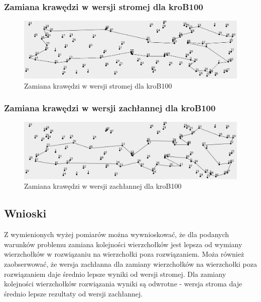 \documentclass[a4paper]{article}
\begin{document}
\subsubsection{Zamiana krawędzi w wersji stromej dla kroB100}

\begin{figure}[H]
\centering
\includegraphics[width=\textwidth]{lab2/kroB_steepest_corners}
\caption{Zamiana krawędzi w wersji stromej dla kroB100}
\end{figure}

\subsubsection{Zamiana krawędzi w wersji zachłannej dla kroB100}

\begin{figure}[H]
\centering
\includegraphics[width=\textwidth]{lab2/kroB_greedy_corners}
\caption{Zamiana krawędzi w wersji zachłannej dla kroB100}
\end{figure}

\subsection{Wnioski}

Z wymienionych wyżej pomiarów można wywnioskować, że dla podanych warunków problemu zamiana kolejności wierzchołków jest lepsza od wymiany wierzchołków w rozwiązaniu na wierzchołki poza rozwiązaniem. Moża również zaobserwować, że wersja zachłanna dla zamiany wierzchołków na wierzchołki poza rozwiązaniem daje średnio lepsze wyniki od wersji stromej. Dla zamiany kolejności wierzchołków rozwiązania wyniki są odwrotne - wersja stroma daje średnio lepsze rezultaty od wersji zachłannej.
\end{document}
